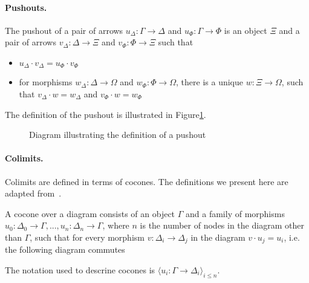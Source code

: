 \paragraph{Pushouts.}
The pushout of a pair of arrows $u_\Delta : \Gamma \to \Delta$ and $u_\Phi : \Gamma \to \Phi$ is an object $\Xi$ and a pair of arrows $v_\Delta : \Delta \to \Xi$ and $v_\Phi : \Phi \to \Xi$ such that 
\begin{itemize}
\item $u_\Delta \cdot v_\Delta = u_\Phi \cdot v_\Phi $
\item for morphisms $w_\Delta : \Delta \to \Omega$ and $w_\Phi : \Phi \to \Omega$, there is a unique $w : \Xi \to \Omega$, such that 
$v_\Delta \cdot w = w_\Delta$ and $v_\Phi \cdot w = w_\Phi$
\end{itemize}
The definition of the pushout is illustrated in Figure\ref{fig:pushoutDef}. 
\begin{figure}
\caption{Diagram illustrating the definition of a pushout}
\label{fig:pushoutDef}
\end{figure}

\paragraph{Colimits.}
Colimits are defined in terms of cocones. The definitions we present here are adapted from~\cite{sannella2012foundations}. 

A cocone over a diagram consists of an object $\Gamma$ and a family of morphisms $u_0 : \Delta_0 \to \Gamma, ..., u_n : \Delta_n \to \Gamma$, where $n$ is the number of nodes in the diagram other than $\Gamma$, such that for every morphism $v : \Delta_i \to \Delta_j$ in the diagram $v \cdot u_j = u_i$, i.e. the following diagram commutes 
The notation used to descrine cocones is 
$\langle u_i : \Gamma \to \Delta_i \rangle_{i\leq n}$.

